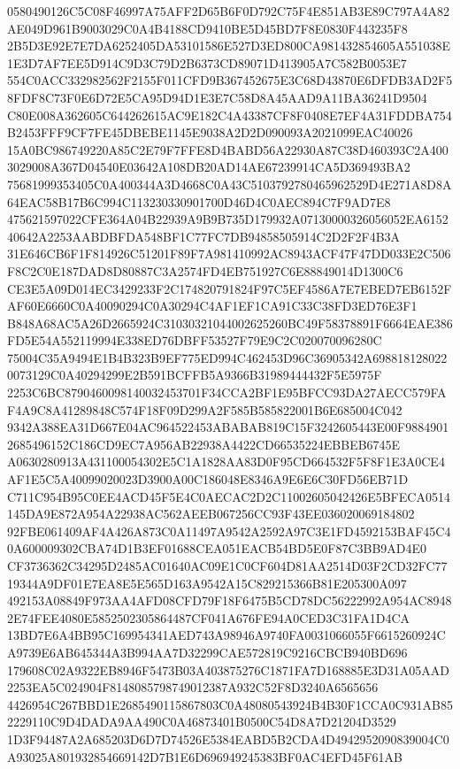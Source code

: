\documentclass[UTF8,fontset=fandol,zihao=-4,a4paper]{ctexart}
\begin{document}
{{0580490126C5C08F46997A75AFF2D65B6F0D792C75F4E851AB3E89C797A4A82AE049D961B9003029C0A4B4188CD9410BE5D45BD7F8E0830F443235F8
2B5D3E92E7E7DA6252405DA53101586E527D3ED800CA981432854605A551038E1E3D7AF7EE5D914C9D3C79D2B6373CD89071D413905A7C582B0053E7
554C0ACC332982562F2155F011CFD9B367452675E3C68D43870E6DFDB3AD2F58FDF8C73F0E6D72E5CA95D94D1E3E7C58D8A45AAD9A11BA36241D9504
C80E008A362605C644262615AC9E182C4A43387CF8F0408E7EF4A31FDDBA754B2453FFF9CF7FE45DBEBE1145E9038A2D2D090093A2021099EAC40026
15A0BC986749220A85C2E79F7FFE8D4BABD56A22930A87C38D460393C2A4003029008A367D04540E03642A108DB20AD14AE67239914CA5D369493BA2
75681999353405C0A400344A3D4668C0A43C5103792780465962529D4E271A8D8A64EAC58B17B6C994C113230330901700D46D4C0AEC894C7F9AD7E8
475621597022CFE364A04B22939A9B9B735D179932A07130000326056052EA615240642A2253AABDBFDA548BF1C77FC7DB94858505914C2D2F2F4B3A
31E646CB6F1F814926C51201F89F7A981410992AC8943ACF47F47DD033E2C506F8C2C0E187DAD8D80887C3A2574FD4EB751927C6E88849014D1300C6
CE3E5A09D014EC3429233F2C174820791824F97C5EF4586A7E7EBED7EB6152FAF60E6660C0A40090294C0A30294C4AF1EF1CA91C33C38FD3ED76E3F1
B848A68AC5A26D2665924C31030321044002625260BC49F58378891F6664EAE386FD5E54A552119994E338ED76DBFF53527F79E9C2C020070096280C
75004C35A9494E1B4B323B9EF775ED994C462453D96C36905342A6988181280220073129C0A40294299E2B591BCFFB5A9366B31989444432F5E5975F
2253C6BC8790460098140032453701F34CCA2BF1E95BFCC93DA27AECC579FAF4A9C8A41289848C574F18F09D299A2F585B585822001B6E685004C042
9342A388EA31D667E04AC964522453ABABAB819C15F3242605443E00F98849012685496152C186CD9EC7A956AB22938A4422CD66535224EBBEB6745E
A0630280913A431100054302E5C1A1828AA83D0F95CD664532F5F8F1E3A0CE4AF1E5C5A40099020023D3900A00C186048E8346A9E6E6C30FD56EB71D
C711C954B95C0EE4ACD45F5E4C0AECAC2D2C11002605042426E5BFECA0514145DA9E872A954A22938AC562AEEB067256CC93F43EE036020069184802
92FBE061409AF4A426A873C0A11497A9542A2592A97C3E1FD4592153BAF45C40A600009302CBA74D1B3EF01688CEA051EACB54BD5E0F87C3BB9AD4E0
CF3736362C34295D2485AC01640AC09E1C0CF604D81AA2514D03F2CD32FC7719344A9DF01E7EA8E5E565D163A9542A15C829215366B81E205300A097
492153A08849F973AA4AFD08CFD79F18F6475B5CD78DC56222992A954AC89482E74FEE4080E5852502305864487CF041A676FE94A0CED3C31FA1D4CA
13BD7E6A4BB95C169954341AED743A98946A9740FA0031066055F6615260924CA9739E6AB645344A3B994AA7D32299CAE572819C9216CBCB940BD696
179608C02A9322EB8946F5473B03A403875276C1871FA7D168885E3D31A05AAD2253EA5C024904F8148085798749012387A932C52F8D3240A6565656
4426954C267BBD1E2685490115867803C0A48080543924B4B30F1CCA0C931AB852229110C9D4DADA9AA490C0A46873401B0500C54D8A7D21204D3529
1D3F94487A2A685203D6D7D74526E5384EABD5B2CDA4D4942952090839004C0A93025A801932854669142D7B1E6D696949245383BF0AC4EFD45F61AB
}}
\end{document}
